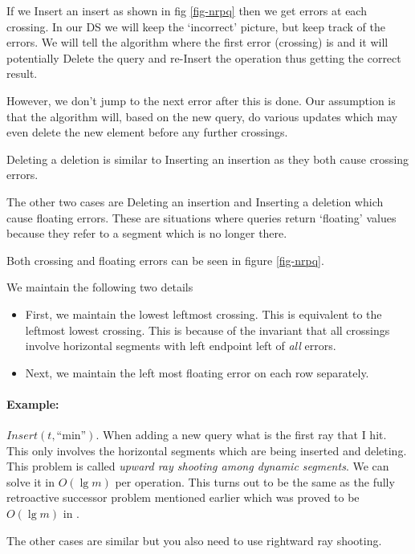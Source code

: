 \documentclass[11pt]{article}
\begin{document}
If we Insert an insert as shown in fig \ref{fig-nrpq} then we get errors at each crossing.  In our DS we will keep the `incorrect' picture, but keep track of the errors.  We will tell the algorithm where the first error (crossing) is and it will potentially Delete the query and re-Insert the operation thus getting the correct result.

However, we don't jump to the next error after this is done. Our assumption is that the algorithm will, based on the new query, do various updates which may even delete the new element before any further crossings.

Deleting a deletion is similar to Inserting an insertion as they both cause crossing errors.

The other two cases are Deleting an insertion and Inserting a deletion which cause floating errors.  These are situations where queries return `floating' values because they refer to a segment which is no longer there.

Both crossing and floating errors can be seen in figure \ref{fig-nrpq}.

We maintain the following two details

\begin{itemize}
\item First, we maintain the lowest leftmost crossing. This is equivalent to the leftmost lowest crossing. This is because of the invariant that all crossings involve horizontal segments with left endpoint left of \emph{all} errors.
\item Next, we maintain the left most floating error on each row separately.
\end{itemize}

\paragraph{Example:} $Insert(t, \text{``min''})$.  When adding a new query what is the first ray that I hit.  This only involves the horizontal segments which are being inserted and deleting.  This problem is called \emph{upward ray shooting among dynamic segments}.  We can solve it in $O(\lg m)$ per operation.  This turns out to be the same as the fully retroactive successor problem mentioned earlier which was proved to be $O(\lg m)$ in \cite{gk}.

The other cases are similar but you also need to use rightward ray shooting.

%

\end{document}
